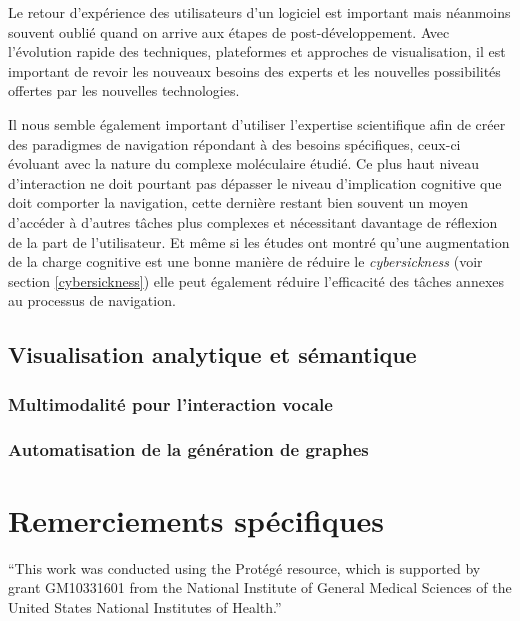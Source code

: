 Le retour d'expérience des utilisateurs d'un logiciel est important mais néanmoins souvent oublié quand on arrive aux étapes de post-développement. Avec l'évolution rapide des techniques, plateformes et approches de visualisation, il est important de revoir les nouveaux besoins des experts et les nouvelles possibilités offertes par les nouvelles technologies. 

Il nous semble également important d'utiliser l'expertise scientifique afin de créer des paradigmes de navigation répondant à des besoins spécifiques, ceux-ci évoluant avec la nature du complexe moléculaire étudié. Ce plus haut niveau d'interaction ne doit pourtant pas dépasser le niveau d'implication cognitive que doit comporter la navigation, cette dernière restant bien souvent un moyen d'accéder à d'autres tâches plus complexes et nécessitant davantage de réflexion de la part de l'utilisateur. Et même si les études ont montré qu'une augmentation de la charge cognitive est une bonne manière de réduire le \textit{cybersickness} (voir section \ref{cybersickness}) elle peut également réduire l'efficacité des tâches annexes au processus de navigation.

\subsection*{Visualisation analytique et sémantique}

\subsubsection{Multimodalité pour l'interaction vocale}

\subsubsection{Automatisation de la génération de graphes}

\section*{Remerciements spécifiques}

“This work was conducted using the Protégé resource, which is supported by grant GM10331601 from the National Institute of General Medical Sciences of the United States National Institutes of Health.” 